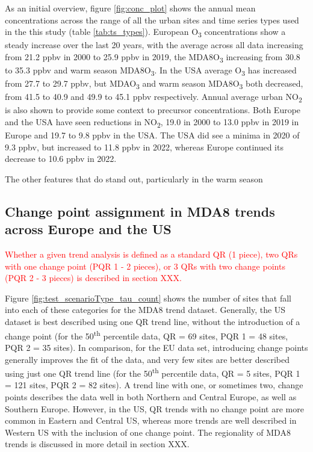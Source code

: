 \documentclass[journal abbreviation, manuscript]{copernicus}
\begin{document}
As an initial overview, figure \ref{fig:conc_plot} shows the annual mean concentrations across the range of all the urban sites and time series types used in the this study (table \ref{tab:ts_types}). European O\textsubscript{3} concentrations show a steady increase over the last 20 years, with the average across all data increasing from 21.2 ppbv in 2000 to 25.9 ppbv in 2019, the MDA8O\textsubscript{3} increasing from 30.8 to 35.3 ppbv and warm season MDA8O\textsubscript{3}. In the USA average O\textsubscript{3} has increased from 27.7 to 29.7 ppbv, but MDAO\textsubscript{3} and warm season MDA8O\textsubscript{3} both decreased, from 41.5 to 40.9 and 49.9 to 45.1 ppbv respectively. Annual average urban NO\textsubscript{2} is also shown to provide some context to precursor concentrations. Both Europe and the USA have seen reductions in NO\textsubscript{2}, 19.0 in 2000 to 13.0 ppbv in 2019 in Europe and 19.7 to 9.8 ppbv in the USA. The USA did see a minima in 2020 of 9.3 ppbv, but increased to 11.8 ppbv in 2022, whereas Europe continued its decrease to 10.6 ppbv in 2022. 

The other features that do stand out, particularly in the warm season 


\subsection{Change point assignment in MDA8 trends across Europe and the US} \label{sect:new_mda8_piecewise_types}

\textcolor{red}{Whether a given trend analysis is defined as a standard QR (1 piece), two QRs with one change point (PQR 1 - 2 pieces), or 3 QRs with two change points (PQR 2 - 3 pieces) is described in section XXX.}

Figure \ref{fig:test_scenarioType_tau_count} shows the number of sites that fall into each of these categories for the MDA8 trend dataset. Generally, the US dataset is best described using one QR trend line, without the introduction of a change point (for the 50\textsuperscript{th} percentile data, QR = 69 sites, PQR 1 = 48 sites, PQR 2 = 35 sites). In comparison, for the EU data set, introducing change points generally improves the fit of the data, and very few sites are better described using just one QR trend line (for the 50\textsuperscript{th} percentile data, QR = 5 sites, PQR 1 = 121 sites, PQR 2 = 82 sites). A trend line with one, or sometimes two, change points describes the data well in both Northern and Central Europe, as well as Southern Europe. However, in the US, QR trends with no change point are more common in Eastern and Central US, whereas more trends are well described in Western US with the inclusion of one change point. The regionality of MDA8 trends is discussed in more detail in section XXX.
 \clearpage
 
\end{document}

